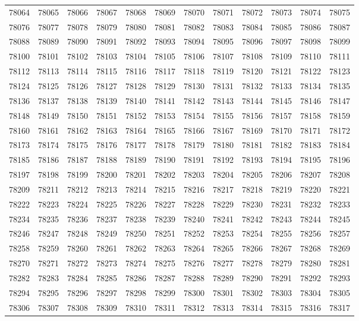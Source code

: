 \begin{center}
\begin{longtable}{llllllllllll}
78064 &78065 &78066 &78067 &78068 &78069 &78070 &78071 &78072 &78073 &78074 &78075 \\
78076 &78077 &78078 &78079 &78080 &78081 &78082 &78083 &78084 &78085 &78086 &78087 \\
78088 &78089 &78090 &78091 &78092 &78093 &78094 &78095 &78096 &78097 &78098 &78099 \\
78100 &78101 &78102 &78103 &78104 &78105 &78106 &78107 &78108 &78109 &78110 &78111 \\
78112 &78113 &78114 &78115 &78116 &78117 &78118 &78119 &78120 &78121 &78122 &78123 \\
78124 &78125 &78126 &78127 &78128 &78129 &78130 &78131 &78132 &78133 &78134 &78135 \\
78136 &78137 &78138 &78139 &78140 &78141 &78142 &78143 &78144 &78145 &78146 &78147 \\
78148 &78149 &78150 &78151 &78152 &78153 &78154 &78155 &78156 &78157 &78158 &78159 \\
78160 &78161 &78162 &78163 &78164 &78165 &78166 &78167 &78169 &78170 &78171 &78172 \\
78173 &78174 &78175 &78176 &78177 &78178 &78179 &78180 &78181 &78182 &78183 &78184 \\
78185 &78186 &78187 &78188 &78189 &78190 &78191 &78192 &78193 &78194 &78195 &78196 \\
78197 &78198 &78199 &78200 &78201 &78202 &78203 &78204 &78205 &78206 &78207 &78208 \\
78209 &78211 &78212 &78213 &78214 &78215 &78216 &78217 &78218 &78219 &78220 &78221 \\
78222 &78223 &78224 &78225 &78226 &78227 &78228 &78229 &78230 &78231 &78232 &78233 \\
78234 &78235 &78236 &78237 &78238 &78239 &78240 &78241 &78242 &78243 &78244 &78245 \\
78246 &78247 &78248 &78249 &78250 &78251 &78252 &78253 &78254 &78255 &78256 &78257 \\
78258 &78259 &78260 &78261 &78262 &78263 &78264 &78265 &78266 &78267 &78268 &78269 \\
78270 &78271 &78272 &78273 &78274 &78275 &78276 &78277 &78278 &78279 &78280 &78281 \\
78282 &78283 &78284 &78285 &78286 &78287 &78288 &78289 &78290 &78291 &78292 &78293 \\
78294 &78295 &78296 &78297 &78298 &78299 &78300 &78301 &78302 &78303 &78304 &78305 \\
78306 &78307 &78308 &78309 &78310 &78311 &78312 &78313 &78314 &78315 &78316 &78317 \\

\end{longtable}
\end{center}
